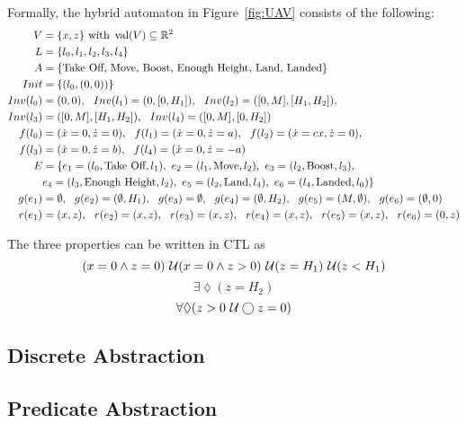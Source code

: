 Formally, the hybrid automaton in Figure~\ref{fig:UAV} consists of the following:
\begin{align*}
V & = \{x,z\} \text{ with } \val(V)\subseteq\mathbb{R}^{2} \\
L & = \{l_{0},l_{1}, l_{2}, l_{3}, l_{4}\} \\
A & = \{ \text{Take Off, Move, Boost, Enough Height, Land, Landed} \} \\
Init & = \{(l_{0},(0,0))\} \\
Inv(l_{0}) & = (0,0),\ \ Inv(l_{1}) = (0,[0,H_{1}]),\ \ Inv(l_{2}) = ([0,M],[H_{1},H_{2}]),\\
Inv(l_{3}) & = ([0,M],[H_{1},H_{2}]), \ \ Inv(l_{4})=([0,M],[0,H_{2}]) \\
f(l_{0}) &=(\dot{x}=0,\dot{z}=0),\ \ f(l_{1})=(\dot{x}=0,\dot{z}=a),\ \ f(l_{2})=(\dot{x}=cx,\dot{z}=0),\\
f(l_{3}) &=(\dot{x}=0,\dot{z}=b), \ \ f(l_{4}) = (\dot{x}=0,\dot{z}=-a) \\
E & = \{e_{1}=(l_{0},\text{Take Off},l_{1}),\ e_{2}=(l_{1},\text{Move},l_{2}),\  e_{3}=(l_{2},\text{Boost},l_{3}),\\
& e_{4}=(l_{3},\text{Enough Height},l_{2}),\  e_{5}=(l_{2},\text{Land},l_{4}),\ e_{6}=(l_{4},\text{Landed},l_{0})\} \\
g(e_{1}) & =\emptyset,\ \ g(e_{2})=(\emptyset,H_{1}),\ \ g(e_{3})=\emptyset, \ \ g(e_{4})=(\emptyset,H_{2}),\ \ g(e_{5})=(M, \emptyset),\ \ g(e_{6})=(\emptyset,0) \\
r(e_{1}) & =(x,z),\ \ r(e_{2})=(x,z),\ \ r(e_{3})=(x,z),\ \ r(e_{4})=(x,z),\ \ r(e_{5}) = (x,z),\ \ r(e_{6})=(0,z) \\
\end{align*}

The three properties can be written in CTL as
\[
(x=0 \land z=0) \ \mathcal{U} (x=0 \land z>0) \ \mathcal{U} (z=H_{1}) \ \mathcal{U} (z<H_{1})
\]
\[
\exists\lozenge (z=H_{2})
\]
\[
\forall \lozenge (z>0 \ \mathcal{U} \bigcirc z=0)
\]

\subsection{Discrete Abstraction}
\label{sec:disc}



\subsection{Predicate Abstraction}
\label{sec:pred}




